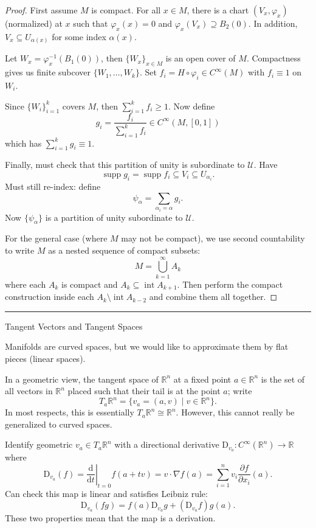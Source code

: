 \documentclass[12pt]{article}
\newcommand{\sepline}{\rule{\textwidth}{0.4pt}}
\theoremstyle{definition}
\newcommand{\R}{\mathbb{R}}
\newcommand{\UU}{\mathcal{U}}
\renewcommand{\phi}{\varphi}
\newcommand{\<}{\left\langle}
\renewcommand{\>}{\right\rangle}
\newcommand{\iso}{\cong}
\newcommand{\seq}{\subseteq}
\newcommand{\dd}{\mathrm{d}}
\newcommand{\DD}{\mathrm{D}}
\DeclareMathOperator{\supp}{supp}
\DeclareMathOperator{\inter}{int}
\newcommand{\pdv}[2]{\frac{\partial #1}{\partial #2}}
\newcommand{\odv}[2]{\frac{\dd #1}{\dd #2}}
\begin{document}
\begin{proof}
    First assume $M$ is compact.
    For all $x \in M$, there is a chart $(V_x, \phi_x)$ (normalized) at $x$ such that $\phi_x(x) = 0$ and $\phi_x(V_x) \supseteq B_2(0)$.
    In addition, $V_x \seq U_{\alpha(x)}$ for some index $\alpha(x)$.

    Let $W_x = \phi_x^{-1}(B_1(0))$, then $\{W_x\}_{x \in M}$ is an open cover of $M$.
    Compactness gives us finite subcover $\{W_1, \dots, W_k\}$.
    Set $f_i = H \circ \phi_i \in C^\infty(M)$ with $f_i \equiv 1$ on $W_i$.

    Since $\{W_i\}_{i=1}^{k}$ covers $M$, then $\sum_{i=1}^{k} f_i \geq 1$.
    Now define
    \[
        g_i = \frac{f_i}{\sum_{i=1}^{k} f_i} \in C^\infty(M, [0, 1])
    \]
    which has $\sum_{i=1}^{k} g_i \equiv 1$.

    Finally, must check that this partition of unity is subordinate to $\UU$.
    Have
    \[
        \supp g_i = \supp f_i \seq V_i \seq U_{\alpha_i}.
    \]
    Must still re-index: define
    \[
        \psi_\alpha = \sum_{\alpha_i = \alpha} g_i.
    \]
    Now $\{\psi_\alpha\}$ is a partition of unity subordinate to $\UU$.

    For the general case (where $M$ may not be compact), we use second countability to write $M$ as a nested sequence of compact subsets:
    \[
        M = \bigcup_{k=1}^{\infty} A_k
    \]
    where each $A_k$ is compact and $A_k \seq \inter A_{k+1}$.
    Then perform the compact construction inside each $A_k \setminus \inter A_{k-2}$ and combine them all together.
\end{proof}

\sepline

Tangent Vectors and Tangent Spaces

Manifolds are curved spaces, but we would like to approximate them by flat pieces (linear spaces).

In a geometric view, the tangent space of $\R^n$ at a fixed point $a \in \R^n$ is the set of all vectors in $\R^n$ placed such that their tail is at the point $a$; write
\[
    T_a\R^n = \{v_a = (a, v) \mid v \in \R^n\}.
\]
In most respects, this is essentially $T_a\R^n \iso \R^n$.
However, this cannot really be generalized to curved spaces.

Identify geometric $v_a \in T_a\R^n$ with a directional derivative $\DD_{v_a} : C^\infty(\R^n) \to \R$ where
\[
    \DD_{v_a}(f)
        = \left.\odv{}{t}\right|_{t=0} f(a + tv)
        = v \cdot \nabla f(a)
        = \sum_{i=1}^{n} v_i \pdv{f}{x_i}(a).
\]
Can check this map is linear and satisfies Leibniz rule:
\[
    \DD_{v_a}(fg) = f(a)\DD_{v_a}g + (\DD_{v_a}f) g(a).
\]
These two properties mean that the map is a derivation.
\end{document}
